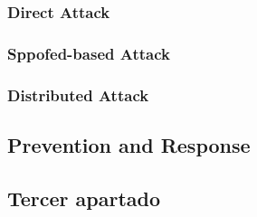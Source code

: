 \subsubsection{Direct Attack}

\subsubsection{Sppofed-based Attack}

\subsubsection{Distributed Attack}

\subsection{Prevention and Response}



\subsection{Tercer apartado}

